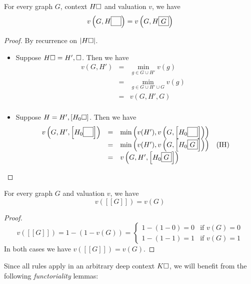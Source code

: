 \begin{lemma}[Iteration]
  For every graph $G$, context $H\square$ and valuation $v$, we have
  $$v\left(G, H\fbox{$\phantom{G}$}\right) = v\left(G, H\fbox{$G$}\right)$$
\end{lemma}
\begin{proof}
  By recurrence on $\left|H\square\right|$.

  \def\arraystretch{1.5}
  \begin{itemize}
    \item[\bcase]
      Suppose $H\square = H', \square$. Then we have
      $$
      \begin{array}{rcll}
        v(G, H')
        &=& \min_{g \in G \cup H'}{v(g)} & \\
        &=& \min_{g \in G \cup H' \cup G}{v(g)} & \\
        &=& v(G, H', G) & \\
      \end{array}
      $$
    \item[\rcase]
      Suppose $H = H', [H_0\square]$. Then we have
      $$
      \begin{array}{rcll}
        v\left(G, H', \left[H_0\fbox{$\phantom{G}$}\right]\right)
        &=& \min\left(v(H'), v\left(G, \left[H_0\fbox{$\phantom{G}$}\right]\right)\right) & \\
        &=& \min\left(v(H'), v\left(G, \left[H_0\fbox{$G$}\right]\right)\right) &\text{(IH)} \\
        &=& v\left(G, H', \left[H_0\fbox{$G$}\right]\right) & \\
      \end{array}
      $$
  \end{itemize}
\end{proof}

\begin{lemma}
  For every graph $G$ and valuation $v$, we have
  $$v([[G]]) = v(G)$$
\end{lemma}
\begin{proof}
  $$
  v([[G]]) = 1 - (1 - v(G)) = \begin{cases}
    1 - (1 - 0) = 0 &\text{if $v(G) = 0$} \\
    1 - (1 - 1) = 1 &\text{if $v(G) = 1$}
  \end{cases}
  $$
  In both cases we have $v([[G]]) = v(G)$.
\end{proof}

Since all rules apply in an arbitrary deep context $K\square$, we will benefit
from the following \emph{functoriality} lemmas:

